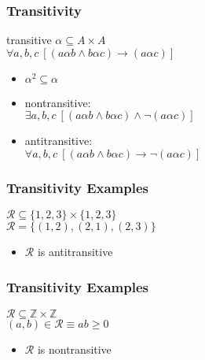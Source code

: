 \documentclass[dvipsnames]{beamer}
\begin{document}
\begin{frame}
  \frametitle{Transitivity}

  \begin{block}{transitive}
    $\alpha \subseteq A \times A$\\
    $\forall a,b,c~[(a \alpha b \wedge b \alpha c) \rightarrow (a \alpha c)]$
  \end{block}

  \pause
  \begin{itemize}
    \item $\alpha^2 \subseteq \alpha$

    \pause
    \medskip
    \item nontransitive:\\
      $\exists a,b,c~[(a \alpha b \wedge b \alpha c) \wedge \neg (a \alpha c)]$

    \pause
    \item antitransitive:\\
      $\forall a,b,c~[(a \alpha b \wedge b \alpha c) \rightarrow \neg (a \alpha c)]$
  \end{itemize}
\end{frame}

\begin{frame}
  \frametitle{Transitivity Examples}

  \begin{example}
    $\mathcal{R} \subseteq \{1,2,3\} \times \{1,2,3\}$\\
    $\mathcal{R} = \{(1,2), (2,1), (2,3)\}$

    \medskip
    \begin{itemize}
      \item $\mathcal{R}$ is antitransitive
    \end{itemize}
  \end{example}
\end{frame}

\begin{frame}
  \frametitle{Transitivity Examples}

  \begin{example}
    $\mathcal{R} \subseteq \mathbb{Z} \times \mathbb{Z}$\\
    $(a,b) \in \mathcal{R} \equiv ab \geq 0$

    \medskip
    \begin{itemize}
      \item $\mathcal{R}$ is nontransitive
    \end{itemize}
  \end{example}
\end{frame}
\end{document}

